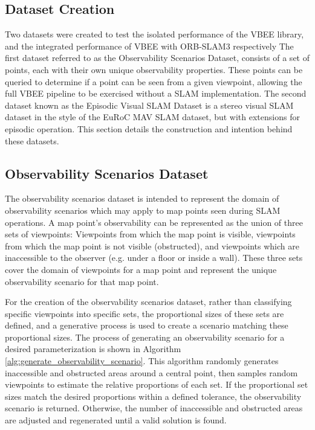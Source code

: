 \subsection{Dataset Creation}

Two datasets were created to test the isolated performance of the VBEE library, and the integrated performance of VBEE with ORB-SLAM3 respectively The first dataset referred to as the Observability Scenarios Dataset, consists of a set of points, each with their own unique observability properties. These points can be queried to determine if a point can be seen from a given viewpoint, allowing the full VBEE pipeline to be exercised without a SLAM implementation. The second dataset known as the Episodic Visual SLAM Dataset is a stereo visual SLAM dataset in the style of the EuRoC MAV SLAM dataset, but with extensions for episodic operation. This section details the construction and intention behind these datasets.

\subsection{Observability Scenarios Dataset}
\label{sec:observability_scenario_dataset}
The observability scenarios dataset is intended to represent the domain of observability scenarios which may apply to map points seen during SLAM operations. A map point's observability can be represented as the union of three sets of viewpoints: Viewpoints from which the map point is visible, viewpoints from which the map point is not visible (obstructed), and viewpoints which are inaccessible to the observer (e.g. under a floor or inside a wall). These three sets cover the domain of viewpoints for a map point and represent the unique observability scenario for that map point.

For the creation of the observability scenarios dataset, rather than classifying specific viewpoints into specific sets, the proportional sizes of these sets are defined, and a generative process is used to create a scenario matching these proportional sizes. The process of generating an observability scenario for a desired parameterization is shown in Algorithm \ref{alg:generate_observability_scenario}. This algorithm randomly generates inaccessible and obstructed areas around a central point, then samples random viewpoints to estimate the relative proportions of each set. If the proportional set sizes match the desired proportions within a defined tolerance, the observability scenario is returned. Otherwise, the number of inaccessible and obstructed areas are adjusted and regenerated until a valid solution is found.

